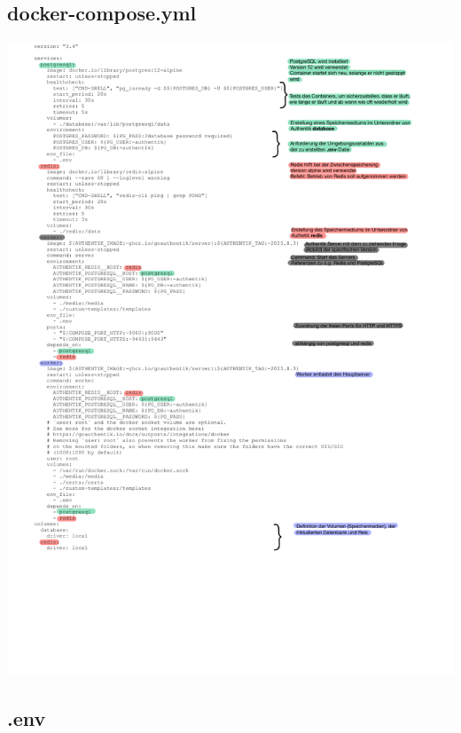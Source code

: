 \subsection{docker-compose.yml}
\label{app:docker-compose.yml}
\includegraphics{Anhang/docker-compose.pdf}

\subsection{.env}
\label{app:dotenv}

